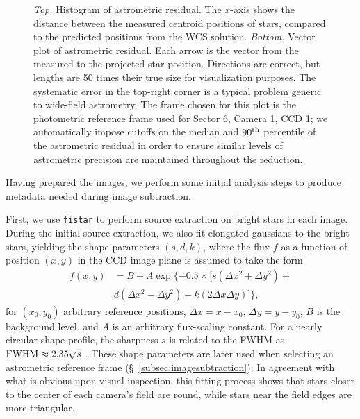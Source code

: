 \documentclass[12pt,twocolumn,tighten]{aastex62}
\begin{document}
\begin{figure}[!t]
	\vspace{-0.8cm}
	\vspace{-0.8cm}
    \caption{
		{\it Top.} Histogram of astrometric residual. The $x$-axis shows 
		the distance between the measured centroid positions of stars, 
		compared to the predicted positions from the WCS solution.
		{\it Bottom.} Vector plot of astrometric residual. Each arrow is 
		the vector from the measured to the projected star position. 
		Directions are correct, but lengths are 50 times their true size for 
		visualization purposes.
    The systematic error in the top-right corner is a typical
    problem generic to wide-field astrometry.
    The frame chosen for this plot is the photometric reference frame used 
    for Sector 6, Camera 1, CCD 1; we automatically 
    impose cutoffs on the median and $90^{\rm th}$ percentile of the 
    astrometric residual in order to ensure similar levels of astrometric 
    precision are maintained throughout the reduction.
	}
	\label{fig:astromresid}
\end{figure}

Having prepared the images, we perform some initial analysis steps to
produce metadata needed during image subtraction.  

First, we use \texttt{fistar} to perform source extraction on bright
stars in each image.  During the initial source extraction, we also
fit elongated gaussians to the bright stars, yielding the shape
parameters $(s,d,k)$, where the flux $f$ as a function of position
$(x,y)$ in the CCD image plane is assumed to take the form
\begin{align}
  f(x,y) &= B + A \exp \{ -0.5 \times [
    s(\Delta x^2 + \Delta y^2) + \\
    \nonumber
    &d(\Delta x^2 - \Delta y^2) +
    k(2\Delta x \Delta y)
  ]  \},
\end{align}
for $(x_0,y_0)$ arbitrary reference positions,
$\Delta x = x-x_0$, $\Delta y = y - y_0$, $B$ is the background
level, and $A$ is an arbitrary
flux-scaling constant.
For a nearly circular shape profile, the sharpness $s$ is related to
the FWHM as ${\rm FWHM} \approx 2.35\sqrt{s}$ \citep[{\it
e.g.},][]{Pal_2009}.  These shape parameters are later used when
selecting an astrometric reference frame
(\S~\ref{subsec:imagesubtraction}).  
In agreement with what is obvious upon visual inspection, this 
fitting process shows that stars closer to the
center of each camera's field are round, while
stars near the field edges are more triangular.
\end{document}
